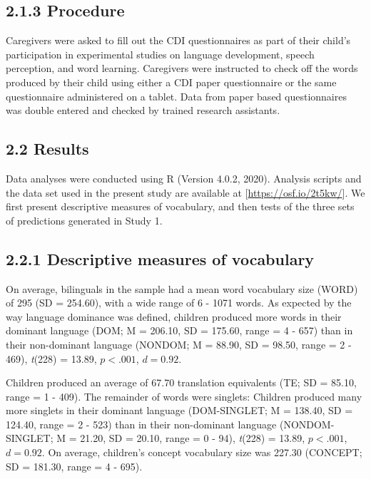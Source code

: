 \documentclass[
  english,
  ,man,floatsintext]{apa6}
\begin{document}
\hypertarget{procedure}{%
\subsection{2.1.3 Procedure}\label{procedure}}

Caregivers were asked to fill out the CDI questionnaires as part of their child's participation in experimental studies on language development, speech perception, and word learning. Caregivers were instructed to check off the words produced by their child using either a CDI paper questionnaire or the same questionnaire administered on a tablet. Data from paper based questionnaires was double entered and checked by trained research assistants.

\hypertarget{results}{%
\subsection{2.2 Results}\label{results}}

Data analyses were conducted using R (Version 4.0.2, 2020). Analysis scripts and the data set used in the present study are available at {[}\url{https://osf.io/2t5kw/}{]}. We first present descriptive measures of vocabulary, and then tests of the three sets of predictions generated in Study 1.

\hypertarget{descriptive-measures-of-vocabulary}{%
\subsection{2.2.1 Descriptive measures of vocabulary}\label{descriptive-measures-of-vocabulary}}

On average, bilinguals in the sample had a mean word vocabulary size (WORD) of 295 (SD = 254.60), with a wide range of 6 - 1071 words. As expected by the way language dominance was defined, children produced more words in their dominant language (DOM; M = 206.10, SD = 175.60, range = 4 - 657) than in their non-dominant language (NONDOM; M = 88.90, SD = 98.50, range = 2 - 469), \emph{t}(228) = 13.89, \(p < .001\), \(d = 0.92\).

Children produced an average of 67.70 translation equivalents (TE; SD = 85.10, range = 1 - 409). The remainder of words were singlets: Children produced many more singlets in their dominant language (DOM-SINGLET; M = 138.40, SD = 124.40, range = 2 - 523) than in their non-dominant language (NONDOM-SINGLET; M = 21.20, SD = 20.10, range = 0 - 94), \emph{t}(228) = 13.89, \(p < .001\), \(d = 0.92\). On average, children's concept vocabulary size was 227.30 (CONCEPT; SD = 181.30, range = 4 - 695).
\end{document}
